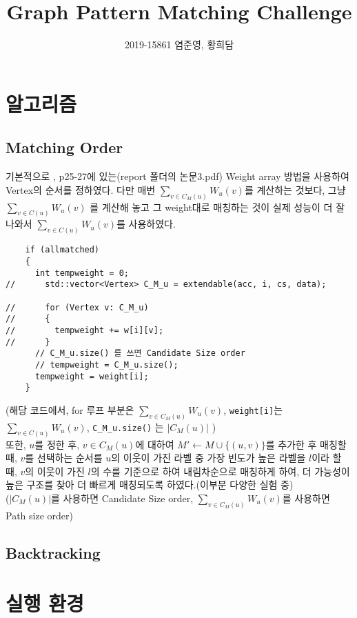 \documentclass{article}
\author{2019-15861 염준영, 황희담}
\title{Graph Pattern Matching Challenge}
\begin{document}
\maketitle
\section{알고리즘}
\subsection{Matching Order}

기본적으로 \cite{한명지2018AEAf}, p25-27에 있는(report 폴더의 논문3.pdf) Weight array 방법을 사용하여 Vertex의 순서를 정하였다.
다만 매번 \(\sum_{v \in C_{M}(u)} W_{u}(v)\)를 계산하는 것보다, 그냥 \(\sum_{v \in C(u)} W_{u}(v)\) 를 계산해 놓고
그 weight대로 매칭하는 것이 실제 성능이 더 잘 나와서 \(\sum_{v \in C(u)} W_{u}(v)\)를 사용하였다.\\
\begin{verbatim}
    if (allmatched)
    {
      int tempweight = 0;
//      std::vector<Vertex> C_M_u = extendable(acc, i, cs, data);

//      for (Vertex v: C_M_u)
//      {
//        tempweight += w[i][v];
//      }
      // C_M_u.size() 를 쓰면 Candidate Size order
      // tempweight = C_M_u.size();
      tempweight = weight[i];
    }
\end{verbatim}
(해당 코드에서, for 루프 부분은 \(\sum_{v \in C_{M}(u)} W_{u}(v)\), \verb|weight[i]|는 \(\sum_{v \in C(u)} W_{u}(v)\), \verb|C_M_u.size()| 는 \(\left| C_{M}(u) \right|\) )\\
또한, \(u\)를 정한 후, \(v \in C_{M}(u)\)에 대하여 \(M' \leftarrow M \cup \{(u, v)\}\)를 추가한 후
매칭할 때, \(v\)를 선택하는 순서를 \(u\)의 이웃이 가진 라벨 중 가장 빈도가 높은 라벨을 \(l\)이라 할 때,
\(v\)의 이웃이 가진 \(l\)의 수를 기준으로 하여 내림차순으로 매칭하게 하여, 
더 가능성이 높은 구조를 찾아 더 빠르게 매칭되도록 하였다.(이부분 다양한 실험 중)\\
(\(\left| C_{M}(u) \right|\)를 사용하면 Candidate Size order, 
\(\sum_{v \in C_{M}(u)} W_{u}(v)\)를 사용하면 Path size order)


\subsection{Backtracking}
\section{실행 환경}
    
\printbibliography
\end{document}

